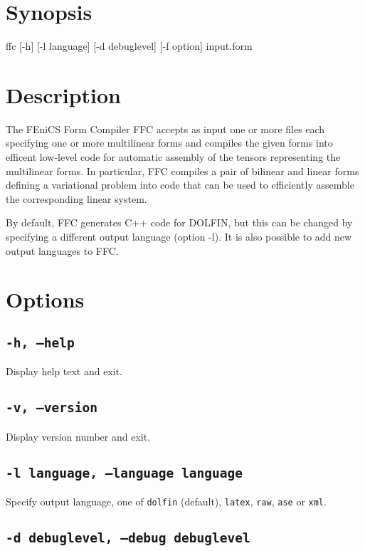 \section{Synopsis}

\begin{code}
 ffc [-h] [-l language] [-d debuglevel] [-f option] input.form
\end{code}

\section{Description}

The FEniCS Form Compiler FFC accepts as input one or more files each
specifying one or more multilinear forms and compiles the given forms
into efficent low-level code for automatic assembly of the tensors
representing the multilinear forms. In particular, FFC compiles a pair
of bilinear and linear forms defining a variational problem into code
that can be used to efficiently assemble the corresponding linear
system.

By default, FFC generates C++ code for DOLFIN, but this can be
changed by specifying a different output language (option -l).
It is also possible to add new output languages to FFC.

\section{Options}

\subsection{\texttt{-h, --help}}

Display help text and exit.

\subsection{\texttt{-v, --version}}

Display version number and exit.

\subsection{\texttt{-l language, --language language}}

Specify output language, one of 
\texttt{dolfin} (default),
\texttt{latex},
\texttt{raw},
\texttt{ase} or
\texttt{xml}.

\subsection{\texttt{-d debuglevel, --debug debuglevel}}

